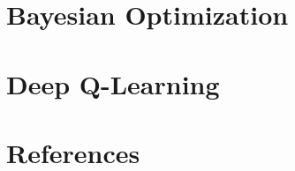 \documentclass{beamer}
\begin{document}
\section{Bayesian Optimization}
  
  \section{Deep Q-Learning}
  \section{References}
  
\end{document}
